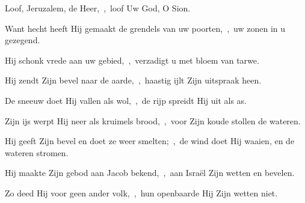 \documentclass[12pt,twoside,a5paper]{article}
\begin{document}
\begin{halfparskip}
  Loof, Jeruzalem, de Heer,~\sep\ loof Uw God, O Sion.


  Want hecht heeft Hij gemaakt de grendels van uw poorten,~\sep\ uw zonen in u gezegend.

  Hij schonk vrede aan uw gebied,~\sep\ verzadigt u met bloem van tarwe.

  Hij zendt Zijn bevel naar de aarde,~\sep\ haastig ijlt Zijn uitspraak heen.

  De sneeuw doet Hij vallen als wol,~\sep\ de rijp spreidt Hij uit als as.

  Zijn ijs werpt Hij neer als kruimels brood,~\sep\ voor Zijn koude stollen de wateren.

  Hij geeft Zijn bevel en doet ze weer smelten;~\sep\ de wind doet Hij waaien, en de wateren stromen.

  Hij maakte Zijn gebod aan Jacob bekend,~\sep\ aan Israël Zijn wetten en bevelen.

  Zo deed Hij voor geen ander volk,~\sep\ hun openbaarde Hij Zijn wetten niet.
\end{halfparskip}

\end{document}
